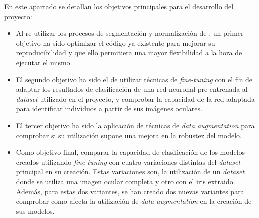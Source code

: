  \label{capitulo2}

En este apartado se detallan los objetivos principales para el desarrollo del proyecto:
\begin{itemize}
    \item Al re-utilizar los procesos de segmentación y normalización de \cite{tfg_iris_2020}, un primer objetivo ha sido optimizar el código ya existente para 
    mejorar su reproducibilidad y que ello permitiera una mayor flexibilidad a la hora de ejecutar el mismo.
    \item El segundo objetivo ha sido el de utilizar técnicas de \textit{fine-tuning} con el fin de adaptar los resultados de clasificación de una red neuronal pre-entrenada al \textit{dataset} utilizado en el proyecto, y comprobar la capacidad de la red adaptada para identificar indivíduos a partir de sus imágenes oculares.
    \item El tercer objetivo ha sido la aplicación de técnicas de \textit{data augmentation} para comprobar si su utilización supone una mejora en la robustez del modelo.
    \item Como objetivo final, comparar la capacidad de clasificación de los modelos creados utilizando \textit{fine-tuning} con cuatro variaciones distintas del \textit{dataset} principal en su creación. Estas variaciones son, la utilización de un \textit{dataset} donde se utiliza una imagen ocular completa y otro con el iris extraido. Además, para estas dos variantes, se han creado dos nuevas variantes para comprobar como afecta la utilización de \textit{data augmentation} en la creación de sus modelos.                                                                                                                                                                                                           
\end{itemize}

